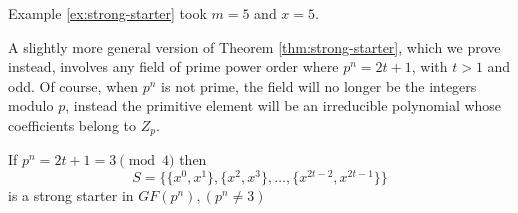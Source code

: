 Example
\ref{ex:strong-starter}
took $m = 5$ and $x = 5$.

A slightly more general version of Theorem
\ref{thm:strong-starter},
which we prove instead, involves any field of prime power order where $p^n = 2t + 1$, with $t > 1$ and odd.
Of course, when $p^n$ is not prime, the field will no longer be the integers modulo $p$, instead the primitive element will be an irreducible polynomial whose coefficients belong to $Z_p$.

\begin{theorem}
\label{thm:strong-starter-2}
If $p^n = 2t + 1 = 3\pmod 4$ then
\begin{equation*}
S = \{\{x^0, x^1\}, \{x^2, x^3\}, \ldots, \{x^{2t - 2}, x^{2t - 1}\}\}
\end{equation*}
is a strong starter in $GF(p^n), (p^n \neq 3)$
\end{theorem}

